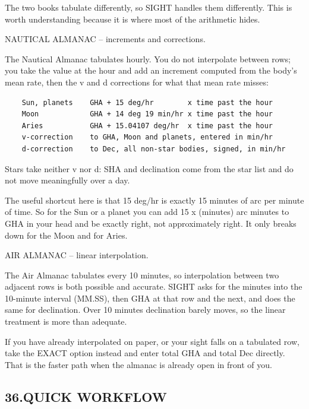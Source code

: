 \documentclass[11pt]{article}
\begin{document}
The two books tabulate differently, so SIGHT handles them differently. This is worth understanding because it is where most of the arithmetic hides.

NAUTICAL ALMANAC -- increments and corrections.

The Nautical Almanac tabulates hourly. You do not interpolate between rows; you take the value at the hour and add an increment computed from the body's mean rate, then the v and d corrections for what that mean rate misses:

\begin{verbatim}
    Sun, planets    GHA + 15 deg/hr        x time past the hour
    Moon            GHA + 14 deg 19 min/hr x time past the hour
    Aries           GHA + 15.04107 deg/hr  x time past the hour
    v-correction    to GHA, Moon and planets, entered in min/hr
    d-correction    to Dec, all non-star bodies, signed, in min/hr
\end{verbatim}

Stars take neither v nor d: SHA and declination come from the star list and do not move meaningfully over a day.

The useful shortcut here is that 15 deg/hr is exactly 15 minutes of arc per minute of time. So for the Sun or a planet you can add 15 x (minutes) arc minutes to GHA in your head and be exactly right, not approximately right. It only breaks down for the Moon and for Aries.

AIR ALMANAC -- linear interpolation.

The Air Almanac tabulates every 10 minutes, so interpolation between two adjacent rows is both possible and accurate. SIGHT asks for the minutes into the 10-minute interval (MM.SS), then GHA at that row and the next, and does the same for declination. Over 10 minutes declination barely moves, so the linear treatment is more than adequate.

If you have already interpolated on paper, or your sight falls on a tabulated row, take the EXACT option instead and enter total GHA and total Dec directly. That is the faster path when the almanac is already open in front of you.

\subsection*{36.\quad QUICK WORKFLOW}
\end{document}
